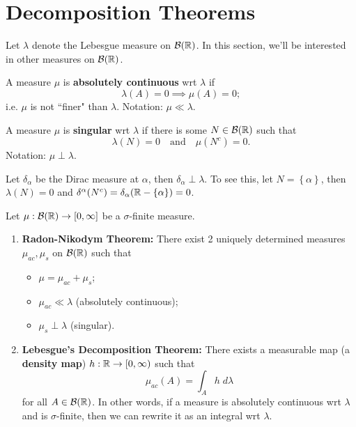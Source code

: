 \documentclass[twoside,10pt]{article}
\begin{document}
\section{Decomposition Theorems}

Let $\lambda$ denote the Lebesgue measure on $\mathcal{B}(\mathbb{R})$. In this section, we'll be interested in other measures on $\mathcal{B}(\mathbb{R})$.

\begin{defn}[]
A measure $\mu$ is \textbf{absolutely continuous} wrt $\lambda$ if
\[
\lambda(A) = 0 \implies \mu(A) = 0;
\] i.e. $\mu$ is not ``finer" than $\lambda$. Notation: $\mu \ll \lambda$.
\end{defn}

\begin{defn}[]
A measure $\mu$ is \textbf{singular} wrt $\lambda$ if there is some $N \in \mathcal{B}(\mathbb{R})$ such that
\[
\lambda(N) = 0 \quad\text{and}\quad \mu(N^{c}) = 0.
\] Notation: $\mu \perp \lambda$.
\end{defn}

\begin{ex}[]
Let $\delta_{\alpha}$ be the Dirac measure at $\alpha$, then $\delta_{\alpha} \perp \lambda$. To see this, let $N = \left\{ \alpha \right\}$, then $\lambda(N) = 0$ and $\delta^{\alpha}(N^{c}) = \delta_{\alpha}(\mathbb{R}-\left\{ \alpha \right\}) = 0$.
\end{ex}

\begin{thrm}
	Let $\mu:\mathcal{B}(\mathbb{R}) \to [0,\infty]$ be a $\sigma$-finite measure.
	\begin{enumerate}
		\item \textbf{Radon-Nikodym Theorem:} There exist 2 uniquely determined measures $\mu_{ac},\mu_{s}$ on $\mathcal{B}(\mathbb{R})$ such that
			\begin{itemize}
				\item $\mu = \mu_{ac} + \mu_{s}$;
				\item $\mu_{ac} \ll \lambda$ (absolutely continuous);
				\item $\mu_{s} \perp \lambda$ (singular).
			\end{itemize}

		\item \textbf{Lebesgue's Decomposition Theorem:} There exists a measurable map (a \textbf{density map}) $h:\mathbb{R}\to [0,\infty)$ such that
			\[
			\mu_{ac}(A) = \int_{A} h\;d\lambda
			\] for all $A \in \mathcal{B}(\mathbb{R})$. In other words, if a measure is absolutely continuous wrt $\lambda$ and is $\sigma$-finite, then we can rewrite it as an integral wrt $\lambda$.
	\end{enumerate}
\end{thrm}
\end{document}
